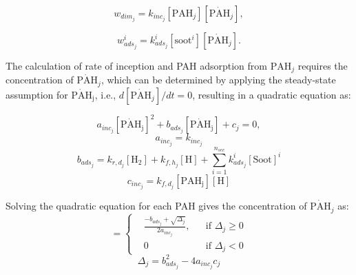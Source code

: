 \begin{equation}
	w_{dim_j} = k_{inc_{j}} [\mathrm{PAH}_j] [\mathrm{\dot{PAH}}_j],
	\label{eqn:wdim_ebri}
\end{equation}

\begin{equation}
	w^i_{ads_j} = k^i_{ads_{j}} [\mathrm{soot}^i] [\mathrm{\dot{PAH}}_j].
\end{equation}

The calculation of rate of inception and PAH adsorption from $\mathrm{PAH}_j$ requires the concentration of $\mathrm{\dot{PAH}}_j$, which can be determined by applying the steady-state assumption for $\mathrm{\dot{PAH}_j}$, i.e., $d[\mathrm{\dot{PAH}}_j]/dt=0$, resulting in a quadratic equation as:




\begin{equation}
	a_{inc_j}[\mathrm{\dot{PAH}_j}]^2+
	b_{ads_j}[\mathrm{\dot{PAH}_j}] + c_j = 0,
\end{equation}
\begin{equation}
	a_{inc_j}=k_{inc_j}
\end{equation}
\begin{equation}
	b_{ads_j}=k_{r,d_j}[\mathrm{H_2}]+k_{f,h_j}[\mathrm{H}]+\sum_{i=1}^{n_{sec}}k^i_{ads_j}[\mathrm{Soot}]^i
\end{equation}
\begin{equation}
	c_{inc_j}=k_{f,d_j}[\mathrm{PAH_j}][\mathrm{H}]
\end{equation}

Solving the quadratic equation for each PAH gives the concentration of $\mathrm{\mathrm{\dot{PAH}}}_j$ as:
\begin{equation}
	[\mathrm{\mathrm{\dot{PAH}}_j}]=
	\left\{
	\begin{aligned}
		&\frac{-b_{ads_j}+\sqrt{\Delta_j}}{2a_{inc_j}},
		&&
		\text{if } \Delta_j \ge 0
		\\
		& 0 
		&&
		\text{if } \Delta_j < 0
	\end{aligned}
	\right.
	\label{eqn:rad_ebri}
\end{equation}
\begin{equation}
	\Delta_j = b_{ads_j}^2-4a_{inc_j}c_{j}
	\label{eqn:delta_ebri}
\end{equation}

